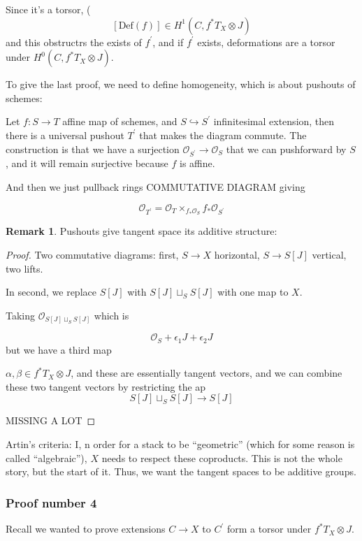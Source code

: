 \documentclass{amsart}
\theoremstyle{definition}
\newtheorem{remark}[dummy]{Remark}
\newcommand{\Def}{\text{Def}}
\newcommand{\OO}{\mathcal{O}}
\begin{document}
Since it's a torsor, 
($$[\Def(f)]\in H^1(C, f^*T_X\otimes J)$$
and this obstructrs the exists of $f^\prime$, and if $f^\prime$ exists, deformations are a torsor under $H^0(C, f^*T_X\otimes J)$.

To give the last proof, we need to define homogeneity, which is about pushouts of schemes:

Let $f:S\to T$ affine map of schemes, and $S\hookrightarrow S^\prime$ infinitesimal extension, then there is a universal pushout $T^\prime$ that makes the diagram commute.  The construction is that we have a surjection
$\OO_{S^\prime}\to\OO_S$ that we can pushforward by $S$, and it will remain surjective because $f$ is affine.  

And then we just pullback rings COMMUTATIVE DIAGRAM
giving

$$\OO_{T^\prime}=\OO_T\times_{f_*\OO_S}f_*\OO_{S^\prime}$$

\begin{remark}

Pushouts give tangent space its additive structure:

\end{remark}


\begin{proof}
Two commutative diagrams: first, $S\to X$ horizontal, $S\to S[J]$ vertical, two lifts.

In second, we replace $S[J]$ with $S[J]\sqcup_S S[J]$ with one map to $X$.

Taking $\OO_{S[J]\sqcup_S S[J]}$ which is

$$\OO_S+\epsilon_1 J+\epsilon_2 J$$ but we have a third map

$\alpha, \beta\in f^* T_X\otimes J$, and these are essentially tangent vectors, and we can combine these two tangent vectors by restricting the ap
$$S[J]\sqcup_S S[J]\to S[J]$$


MISSING A LOT

\end{proof}


Artin's criteria: I, n order for a stack to be ``geometric'' (which for some reason is called ``algebraic''), $X$ needs to respect these coproducts.  This is not the whole story, but the start of it.  Thus, we want the tangent spaces to be additive groups.


\subsubsection{Proof number 4} 
Recall we wanted to prove extensions $C\to X$ to $C^\prime$ form a torsor under $f^*T_X\otimes J$.
\end{document}
